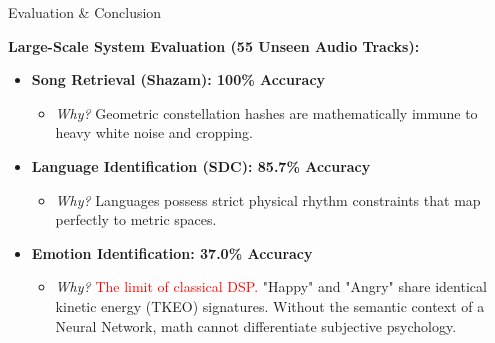 \documentclass[aspectratio=169,11pt]{beamer}
\begin{document}
\begin{frame}[fragile,t]{Evaluation \& Conclusion}
  \vspace{0.3cm}
  
  \textbf{Large-Scale System Evaluation (55 Unseen Audio Tracks):}
  \vspace{0.2cm}
  \begin{itemize}
      \item \textbf{Song Retrieval (Shazam): 100\% Accuracy}
      \begin{itemize}
          \item \textit{Why?} Geometric constellation hashes are mathematically immune to heavy white noise and cropping.
      \end{itemize}
      \item \textbf{Language Identification (SDC): 85.7\% Accuracy}
      \begin{itemize}
          \item \textit{Why?} Languages possess strict physical rhythm constraints that map perfectly to metric spaces.
      \end{itemize}
      \item \textbf{Emotion Identification: 37.0\% Accuracy}
      \begin{itemize}
          \item \textit{Why?} \textcolor{red}{The limit of classical DSP.} "Happy" and "Angry" share identical kinetic energy (TKEO) signatures. Without the semantic context of a Neural Network, math cannot differentiate subjective psychology.
      \end{itemize}
  \end{itemize}
\end{frame}
\end{document}
